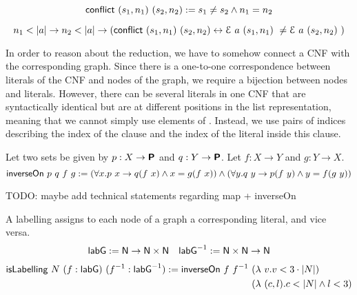 \documentclass[a4paper,UKenglish,cleveref, autoref]{lipics-v2019}
\begin{document}
\begin{definition}
  \[\normalfont\textsf{conflict}~(s_1, n_1)~(s_2, n_2) := s_1 \neq s_2 \land n_1 = n_2 \]
\end{definition}
\begin{proposition}\label{prop:conflictingassgn}
  \[n_1 < |a| \rightarrow n_2 < |a| \rightarrow (\normalfont\textsf{conflict}~(s_1, n_1)~(s_2, n_2) \leftrightarrow \mathcal{E}~a~(s_1, n_1)~ \neq \mathcal{E}~a~(s_2, n_2)~) \]
\end{proposition}

In order to reason about the reduction, we have to somehow connect a CNF with the corresponding graph. Since there is a one-to-one correspondence between literals of the CNF and nodes of the graph, we require a bijection between nodes and literals. However, there can be several literals in one CNF that are syntactically identical but are at different positions in the list representation, meaning that we cannot simply use elements of \literal. Instead, we use pairs of indices describing the index of the clause and the index of the literal inside this clause.

\begin{definition}
  Let two sets be given by $p : X \rightarrow \textsf{\bfseries P}$ and $q : Y \rightarrow \textsf{\bfseries P}$. Let $f : X \rightarrow Y$ and $g : Y \rightarrow X$.
  \[\normalfont\textsf{inverseOn}~p~q~f~g := (\forall x. p~x \rightarrow q(f~x) \land x = g(f~x)) \land (\forall y. q~y \rightarrow p(f~y) \land y = f(g~y)) \]
\end{definition}

TODO: maybe add technical statements regarding map + inverseOn

\begin{definition}
  A labelling assigns to each node of a graph a corresponding literal, and vice versa.
  \begin{align*}
  \normalfont\textsf{labG} := \mathsf{N} \rightarrow \mathsf{N} \times \mathsf{N} && \normalfont\textsf{labG}^{-1} := \mathsf{N} \times \mathsf{N} \rightarrow \mathsf{N}
  \end{align*}
  \begin{align*}
  \normalfont\textsf{isLabelling}~N~(f : \normalfont\textsf{labG})~(f^{-1} : \normalfont\textsf{labG}^{-1}) := \normalfont\textsf{inverseOn}~f~f^{-1}~ &(\lambda~v. v < 3 \cdot |N|)\\
  ~&(\lambda~(c, l). c < |N| \land l < 3) 
\end{align*}
\end{definition}
\end{document}
